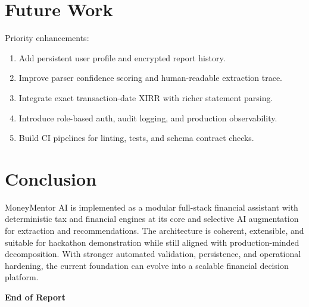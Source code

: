 \documentclass[12pt,a4paper]{article}
\begin{document}
\section{Future Work}
Priority enhancements:
\begin{enumerate}
	\item Add persistent user profile and encrypted report history.
	\item Improve parser confidence scoring and human-readable extraction trace.
	\item Integrate exact transaction-date XIRR with richer statement parsing.
	\item Introduce role-based auth, audit logging, and production observability.
	\item Build CI pipelines for linting, tests, and schema contract checks.
\end{enumerate}

\section{Conclusion}
MoneyMentor AI is implemented as a modular full-stack financial assistant with deterministic tax and financial engines at its core and selective AI augmentation for extraction and recommendations. The architecture is coherent, extensible, and suitable for hackathon demonstration while still aligned with production-minded decomposition. With stronger automated validation, persistence, and operational hardening, the current foundation can evolve into a scalable financial decision platform.

\vspace{1em}
\noindent\textbf{End of Report}
\end{document}
